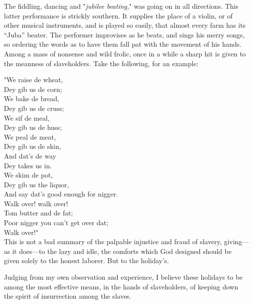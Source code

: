 The fiddling, dancing and "\emph{jubilee beating,}" was going on in all
directions. This latter performance is strickly southern. It supplies
the place of a violin, or of other musical instruments, and is played so
easily, that almost every farm has its ``Juba'' beater. The performer
improvises as he beats, and sings his merry songs, so ordering the words
as to have them fall pat with the movement of his hands. Among a mass of
nonsense and wild frolic, once in a while a sharp hit is given to the
meanness of slaveholders. Take the following, for an example:

{"}We raise de wheat,\\
Dey gib us de corn;\\
We bake de bread,\\
Dey gib us de cruss;\\
We sif de meal,\\
Dey gib us de huss;\\
{\protect\hypertarget{253}{}{}}We peal de meat,\\
Dey gib us de skin,\\
And dat's de way\\
Dey takes us in.\\
We skim de pot,\\
Dey gib us the liquor,\\
And say dat's good enough for nigger.\\
{﻿}Walk over! walk over!\\
{﻿}Tom butter and de fat;\\
{﻿}Poor nigger you can't get over dat;\\
{﻿}Walk over!"\\

This is not a bad summary of the palpable injustice and fraud of
slavery, giving---as it does---to the lazy and idle, the comforts which
God designed should be given solely to the honest laborer. But to the
holiday's.

Judging from my own observation and experience, I believe these holidays
to be among the most effective means, in the hands of slaveholders, of
keeping down the spirit of insurrection among the slaves.

